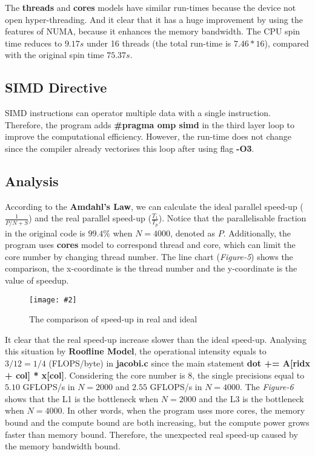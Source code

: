 \documentclass[10pt, a4paper]{article}
\newcommand{\figuremacro}[5]{
    \begin{figure}[#1]
        \centering
        \texttt{[image: \#2]}
        \caption[#3]{\textbf{#3}#4}
        \label{fig:#2}
    \end{figure}
}
\begin{document}
    The \textbf{threads} and \textbf{cores} models have similar run-times because the device not open hyper-threading. And it clear that it has a huge improvement by using the features of NUMA, because it enhances the memory bandwidth. The CPU spin time reduces to $9.17s$ under 16 threads (the total run-time is $7.46 * 16$), compared with the original spin time $75.37s$.
	
	
	\subsection{SIMD Directive}
	
    SIMD instructions can operator multiple data with a single instruction. Therefore, the program adds \textbf{\#pragma omp simd} in the third layer loop to improve the computational efficiency. However, the run-time does not change since the compiler already vectorises this loop after using flag \textbf{-O3}.


	\subsection{Analysis}
    
    According to the \textbf{Amdahl's Law}, we can calculate the ideal parallel speed-up ($\frac{1}{P/N+S}$) and the real parallel speed-up ($\frac{T_1}{T_p}$).  Notice that the parallelisable fraction in the original code is $99.4\%$ when $N=4000$, denoted as $P$. Additionally, the program uses \textbf{cores} model to correspond thread and core, which can limit the core number by changing thread number. The line chart (\textit{Figure-5}) shows the comparison, the x-coordinate is the thread number and the y-coordinate is the value of speedup.
    
    \figuremacro{h}{figure5}{}{ The comparison of speed-up in real and ideal }{1.0}
	
    It clear that the real speed-up increase slower than the ideal speed-up. Analysing this situation by \textbf{Roofline Model}, the operational intensity equals to $3/12=1/4$ (FLOPS/byte) in \textbf{jacobi.c} since the main statement \textbf{dot += A[ridx + col] * x[col]}. Considering the core number is $8$, the single precisions equal to $5.10$ GFLOPS/s in $N=2000$ and $2.55$ GFLOPS/s in $N=4000$. The \textit{Figure-6} shows that the L1 is the bottleneck when $N=2000$ and the L3 is the bottleneck when $N=4000$. In other words, when the program uses more cores, the memory bound and the compute bound are both increasing, but the compute power grows faster than memory bound. Therefore, the unexpected real speed-up caused by the memory bandwidth bound.
	
\end{document}
